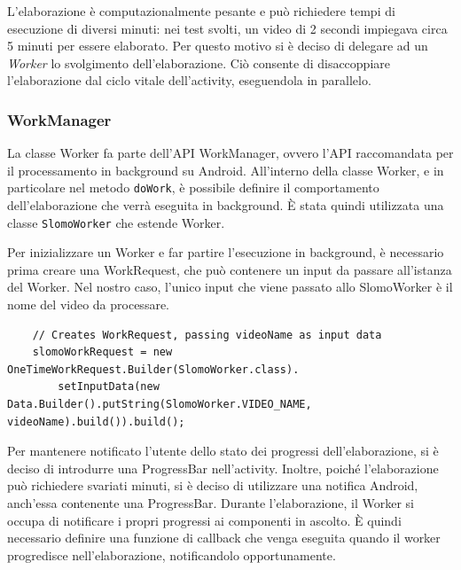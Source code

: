 L'elaborazione è computazionalmente pesante e può richiedere tempi di esecuzione di diversi minuti: nei test svolti,
un video di 2 secondi impiegava circa 5 minuti per essere elaborato.
Per questo motivo si è deciso di delegare ad un \textit{Worker} lo svolgimento dell'elaborazione. Ciò consente di disaccoppiare
l'elaborazione dal ciclo vitale dell'activity, eseguendola in parallelo.

\subsubsection*{WorkManager}

La classe Worker fa parte dell'API WorkManager, ovvero l'API raccomandata per il processamento in background su Android.
All'interno della classe Worker, e in particolare nel metodo \texttt{doWork}, è possibile definire il comportamento 
dell'elaborazione che verrà eseguita in background. È stata quindi utilizzata una classe \texttt{SlomoWorker} che estende
Worker.

Per inizializzare un Worker e far partire l'esecuzione in background, è necessario prima creare una WorkRequest,
che può contenere un input da passare all'istanza del Worker. Nel nostro caso, l'unico input che viene passato allo
SlomoWorker è il nome del video da processare.

\begin{lstlisting}
    // Creates WorkRequest, passing videoName as input data
    slomoWorkRequest = new OneTimeWorkRequest.Builder(SlomoWorker.class).
        setInputData(new Data.Builder().putString(SlomoWorker.VIDEO_NAME, videoName).build()).build();
\end{lstlisting}

Per mantenere notificato l'utente dello stato dei progressi dell'elaborazione, si è deciso di introdurre una ProgressBar 
nell'activity. Inoltre, poiché l'elaborazione può richiedere svariati minuti, si è deciso di utilizzare una notifica
Android, anch'essa contenente una ProgressBar. Durante l'elaborazione, il Worker si occupa di notificare i propri progressi
ai componenti in ascolto. È quindi necessario definire una funzione di callback che venga eseguita quando il worker progredisce
nell'elaborazione, notificandolo opportunamente.

